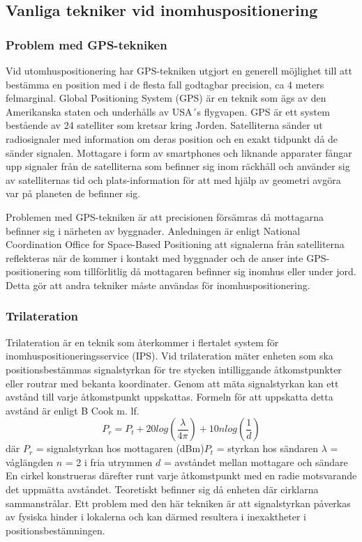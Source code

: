 \documentclass[swedish, a4paper,12pt]{article}
\begin{document}
\subsection{Vanliga tekniker vid inomhuspositionering}

\subsubsection{Problem med GPS-tekniken}
Vid utomhuspositionering har GPS-tekniken utgjort en generell möjlighet till att bestämma en position med i de flesta fall godtagbar precision, ca 4 meters felmarginal\cite{GPS_US_ACCURACY}.
Global Positioning System (GPS) är en teknik som ägs av den Amerikanska staten och underhålls av USA´s flygvapen. GPS är ett system bestående av 24 satelliter som kretsar kring Jorden. Satelliterna sänder ut radiosignaler med information om deras position och en exakt tidpunkt då de sänder signalen. Mottagare i form av smartphones och liknande apparater fångar upp signaler från de satelliterna som befinner sig inom räckhåll och använder sig av satelliternas tid och plats-information för att med hjälp av geometri avgöra var på planeten de befinner sig.\cite{GPS_US_HOW}

Problemen med GPS-tekniken är att precisionen försämras då mottagarna befinner sig i närheten av byggnader. Anledningen är enligt National Coordination Office for Space-Based Positioning att signalerna från satelliterna reflekteras när de kommer i kontakt med byggnader och de anser inte GPS-positionering som tillförlitlig då mottagaren befinner sig inomhus eller under jord.\cite{GPS_US_ACCURACY} Detta gör att andra tekniker måste användas för inomhuspositionering.

\subsubsection{Trilateration}\label{triangulering}
Trilateration är en teknik som återkommer i flertalet system för inomhuspositioneringsservice (IPS). Vid trilateration mäter enheten som ska positionsbestämmas signalstyrkan för tre stycken intilliggande åtkomstpunkter eller routrar med bekanta koordinater. Genom att mäta signalstyrkan kan ett avstånd till varje åtkomstpunkt uppskattas. Formeln för att uppskatta detta avstånd är enligt B Cook m. lf.\cite{cook2005indoor}
\newline
$$ P_r = P_t + 20log(\frac{\lambda}{4\pi}) + 10nlog(\frac{1}{d})$$
där
$  P_r $ = signalstyrkan hos mottagaren (dBm)\newline $P_t$ = styrkan hos sändaren\newline
$\lambda$ = våglängden\newline
$ n $ = 2 i fria utrymmen\newline
$ d $ = avståndet mellan mottagare och sändare
\bigskip
\newline
En cirkel konstrueras därefter runt varje åtkomstpunkt med en radie motsvarande det uppmätta avståndet. %
Teoretiskt befinner sig då enheten där cirklarna sammanstrålar. Ett problem med den här tekniken är att signalstyrkan påverkas av fysiska hinder i lokalerna och kan därmed resultera i inexaktheter i positionsbestämningen.
\end{document}
